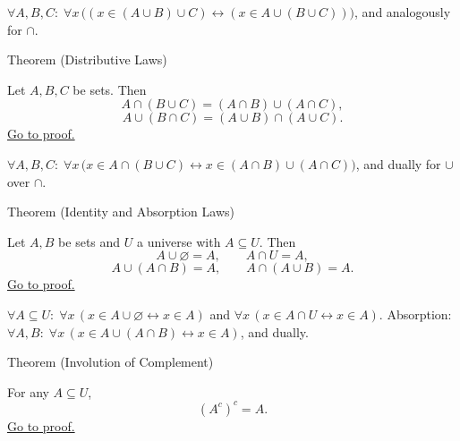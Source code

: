 \NoLocalDependencies

\begin{remark*}
$\forall A, B, C:\; \forall x\,\bigl((x \in (A \cup B) \cup C) \leftrightarrow (x \in A \cup (B \cup C))\bigr)$, and analogously for $\cap$.
\end{remark*}

\begin{theorembox}{Theorem (Distributive Laws)}
\begin{theorem}\label{thm:distributivity}
Let $A,B,C$ be sets. Then
\[
A \cap (B \cup C) = (A \cap B) \cup (A \cap C),
\]
\[
A \cup (B \cap C) = (A \cup B) \cap (A \cup C).
\]
\hyperref[prf:distributivity]{Go to proof.}
\end{theorem}
\end{theorembox}

\NoLocalDependencies

\begin{remark*}
$\forall A, B, C:\; \forall x\,\bigl(x \in A \cap (B \cup C) \leftrightarrow x \in (A \cap B) \cup (A \cap C)\bigr)$, and dually for $\cup$ over $\cap$.
\end{remark*}

\begin{theorembox}{Theorem (Identity and Absorption Laws)}
\begin{theorem}\label{thm:identity-absorption}
Let $A,B$ be sets and $U$ a universe with $A \subseteq U$. Then
\[
A \cup \varnothing = A,
\qquad
A \cap U = A,
\]
\[
A \cup (A \cap B) = A,
\qquad
A \cap (A \cup B) = A.
\]
\hyperref[prf:identity-absorption]{Go to proof.}
\end{theorem}
\end{theorembox}

\NoLocalDependencies

\begin{remark*}
$\forall A \subseteq U:\; \forall x\,(x \in A \cup \varnothing \leftrightarrow x \in A)$ and $\forall x\,(x \in A \cap U \leftrightarrow x \in A)$.
Absorption: $\forall A, B:\; \forall x\,(x \in A \cup (A \cap B) \leftrightarrow x \in A)$, and dually.
\end{remark*}

\begin{theorembox}{Theorem (Involution of Complement)}
\begin{theorem}\label{thm:involution}
For any $A \subseteq U$,
\[
(A^c)^c = A.
\]
\hyperref[prf:involution]{Go to proof.}
\end{theorem}
\end{theorembox}


